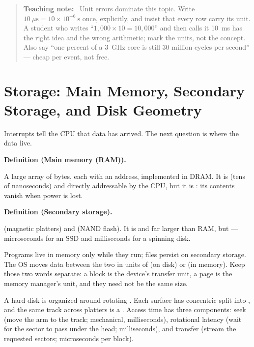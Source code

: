 \documentclass[11pt]{article}
\newenvironment{definitionbox}[1]{%
  \par\noindent\textbf{Definition (#1).}\ \itshape
}{\par\vspace{0.3em}}
\newenvironment{teachingaside}{\begin{quote}\small\color{primary-gold}\textbf{Teaching note:}\ }{\end{quote}}
\begin{document}
\begin{teachingaside}
Unit errors dominate this topic. Write $10\ \mu\text{s} = 10 \times 10^{-6}\ \text{s}$
once, explicitly, and insist that every row carry its unit. A student who writes
``$1{,}000 \times 10 = 10{,}000$'' and then calls it 10~ms has the right idea and
the wrong arithmetic; mark the units, not the concept. Also say ``one percent of
a 3~GHz core is still 30 million cycles per second'' --- cheap per event, not
free.
\end{teachingaside}

\section{Storage: Main Memory, Secondary Storage, and Disk Geometry}

Interrupts tell the CPU that data has arrived. The next question is where the
data live.

\begin{definitionbox}{Main memory (RAM)}
A large array of bytes, each with an address, implemented in DRAM. It is
 (tens of nanoseconds) and directly addressable by the CPU, but it is
: its contents vanish when power is lost.
\end{definitionbox}

\begin{definitionbox}{Secondary storage}
 (magnetic platters) and  (NAND flash).
It is  and far larger than RAM, but  --- microseconds for an SSD and milliseconds for a spinning disk.
\end{definitionbox}

Programs live in memory only while they run; files persist on secondary storage.
The OS moves data between the two in units of  (on disk) or
 (in memory). Keep those two words separate: a block is the device's
transfer unit, a page is the memory manager's unit, and they need not be the same
size.

A hard disk is organized around rotating . Each surface has
concentric  split into , and the same track across
platters is a . Access time has three components: seek (move the
arm to the track; mechanical, milliseconds), rotational latency (wait for the
sector to pass under the head; milliseconds), and transfer (stream the requested
sectors; microseconds per block).
\end{document}
